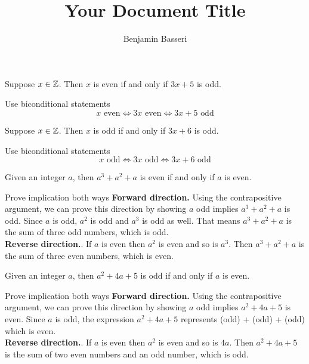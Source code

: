 \documentclass{article}
\title{Your Document Title}
\author{Benjamin Basseri}
\begin{document}
\maketitle

\begin{problem}
Suppose $x \in \mathbb{Z}$. Then $x$ is even if and only if $3x + 5$ is odd.
\end{problem}

\begin{solution}{Use biconditional statements}
  $$x \text{ even} \iff 3x \text{ even} \iff 3x + 5 \text{ odd}$$
\end{solution}

\begin{problem}
Suppose $x \in \mathbb{Z}$. Then $x$ is odd if and only if $3x + 6$ is odd.
\end{problem}
\begin{solution}{Use biconditional statements}
  $$x \text{ odd} \iff 3x \text{ odd} \iff 3x + 6 \text{ odd}$$
\end{solution}

\begin{problem}
Given an integer $a$, then $a^3 + a^2 + a$ is even if and only if $a$ is even.
\end{problem}
\begin{solution}{Prove implication both ways}
  \textbf{Forward direction.} Using the contrapositive argument, we can prove this direction by showing $a$ odd implies $a^3 + a^2 + a$ is odd. Since $a$ is odd, $a^2$ is odd and $a^3$ is odd as well. That means $a^3 + a^2 + a$ is the sum of three odd numbers, which is odd.
  \\
  \textbf{Reverse direction.}. If $a$ is even then $a^2$ is even and so is $a^3$. Then $a^3 + a^2 + a$ is the sum of three even numbers, which is even.
\end{solution}

\begin{problem}
Given an integer $a$, then $a^2 + 4a + 5$ is odd if and only if $a$ is even.
\end{problem}
\begin{solution}{Prove implication both ways}
  \textbf{Forward direction.} Using the contrapositive argument, we can prove this direction by showing $a$ odd implies $a^2 + 4a + 5$ is even. Since $a$ is odd, the expression $a^2 + 4a + 5$ represents (odd) + (odd) + (odd) which is even.
  \\
  \textbf{Reverse direction.}. If $a$ is even then $a^2$ is even and so is $4a$. Then $a^2 + 4a + 5$ is the sum of two even numbers and an odd number, which is odd.
\end{solution}
\end{document}
